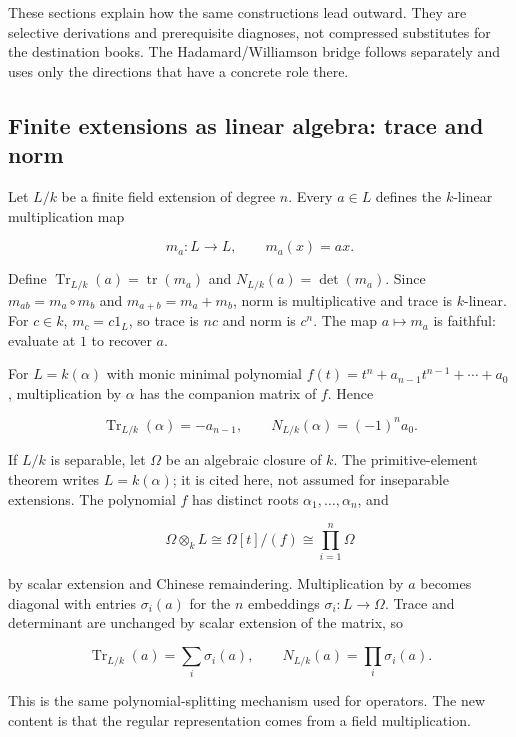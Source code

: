 \documentclass[
  11pt,
]{article}
\begin{document}
These sections explain how the same constructions lead outward. They are
selective derivations and prerequisite diagnoses, not compressed
substitutes for the destination books. The Hadamard/Williamson bridge
follows separately and uses only the directions that have a concrete
role there.

\subsection{Finite extensions as linear algebra: trace and
norm}\label{finite-extensions-as-linear-algebra-trace-and-norm}

Let \(L/k\) be a finite field extension of degree \(n\). Every
\(a\in L\) defines the \(k\)-linear multiplication map

\[m_a:L\to L,\qquad m_a(x)=ax.\]

Define \(\operatorname{Tr}_{L/k}(a)=\operatorname{tr}(m_a)\) and
\(N_{L/k}(a)=\det(m_a)\). Since \(m_{ab}=m_a\circ m_b\) and
\(m_{a+b}=m_a+m_b\), norm is multiplicative and trace is \(k\)-linear.
For \(c\in k\), \(m_c=c1_L\), so trace is \(nc\) and norm is \(c^n\).
The map \(a\mapsto m_a\) is faithful: evaluate at \(1\) to recover
\(a\).

For \(L=k(\alpha)\) with monic minimal polynomial
\(f(t)=t^n+a_{n-1}t^{n-1}+\cdots+a_0\), multiplication by \(\alpha\) has
the companion matrix of \(f\). Hence

\[\operatorname{Tr}_{L/k}(\alpha)=-a_{n-1},\qquad
N_{L/k}(\alpha)=(-1)^n a_0.\]

If \(L/k\) is separable, let \(\Omega\) be an algebraic closure of
\(k\). The primitive-element theorem writes \(L=k(\alpha)\); it is cited
here, not assumed for inseparable extensions. The polynomial \(f\) has
distinct roots \(\alpha_1,\ldots,\alpha_n\), and

\[\Omega\otimes_k L\cong\Omega[t]/(f)
\cong\prod_{i=1}^n\Omega\]

by scalar extension and Chinese remaindering. Multiplication by \(a\)
becomes diagonal with entries \(\sigma_i(a)\) for the \(n\) embeddings
\(\sigma_i:L\to\Omega\). Trace and determinant are unchanged by scalar
extension of the matrix, so

\[\operatorname{Tr}_{L/k}(a)=\sum_i\sigma_i(a),\qquad
N_{L/k}(a)=\prod_i\sigma_i(a).\]

This is the same polynomial-splitting mechanism used for operators. The
new content is that the regular representation comes from a field
multiplication.
\end{document}
